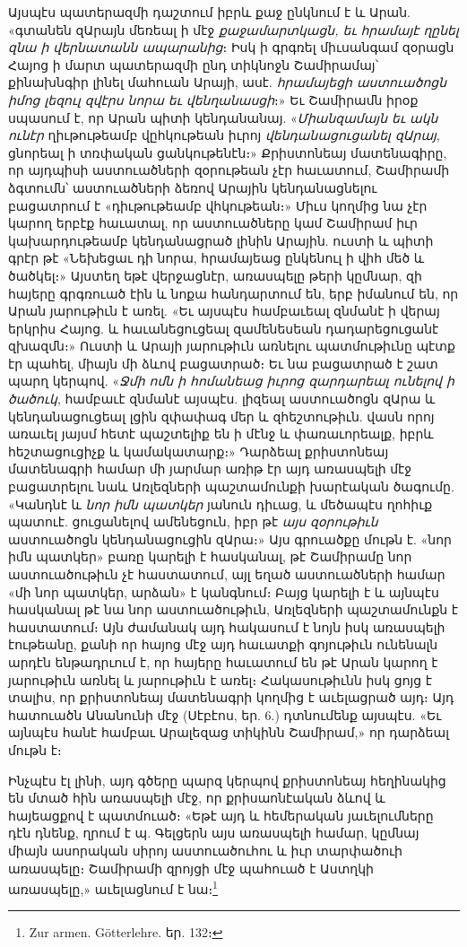 \documentclass{article}
\begin{document}
{Այսպէս պատերազմի դաշտում իբրև քաջ ընկնում է և Արան. «գտանեն զԱրայն մեռեալ ի մէջ \emph{քաջամարտկացն, եւ հրամայէ ղընել զնա ի վերնատանն ապարանից}։ Իսկ ի գրգռել միւսանգամ զօրացն Հայոց ի մարտ պատերազմի ընդ տիկնոջն Շամիրամայ՝ քինախնգիր լինել մահուան Արայի, ասէ. \emph{հրամայեցի աստուածոցն իմոց լեզուլ զվէրս նորա եւ վենղանասցի}։» Եւ Շամիրամն իրօք սպասում է, որ Արան պիտի կենդանանայ. «\emph{Միանզամայն եւ ակն ունէր} ղիւթութեամբ վըհկութեան իւրոյ \emph{վենդանացուցանել զԱրայ}, ցնորեալ ի տռփական ցանկութենէն։» Քրիստոնեայ մատենագիրը, որ այդպիսի աստուածների զօրութեան չէր հաւատում, Շամիրամի ձգտումն՝ աստուածների ձեռով Արային կենդանացնելու բացատրում է «դիւթութեամբ վհկութեան։» Միւս կողմից նա չէր կարող երբէք հաւատալ, որ աստուածները կամ Շամիրամ իւր կախարդութեամբ կենդանացրած լինին Արային. ուստի և պիտի գրէր թէ «Նեխեցաւ դի նորա, հրամայեաց ընկենուլ ի վիհ մեծ և ծածկել։» Այստեղ եթէ վերջացնէր, առասպելը թերի կըմնար, զի հայերը գրգռուած էին և նոքա հանդարտում են, երբ իմանում են, որ Արան յարութիւն է առել. «Եւ այսպէս համբաւեալ զնմանէ ի վերայ երկրիս Հայոց. և հաւանեցուցեալ զամենեսեան դադարեցուցանէ զխազմն։» Ուստի և Արայի յարութիւն առնելու պատմութիւնը պէտք էր պահել, միայն մի ձևով բացատրած։ Եւ նա բացատրած է շատ պարղ կերպով. «\emph{Ջմի ոմն ի հոմանեաց իւրոց զարդարեալ ունելով ի ծածուկ}, համբաւէ զնմանէ այսպէս. լիզեալ աստուածոցն զԱրա և կենդանացուցեալ լցին զփափագ մեր և զհեշտութիւն. վասն որոյ առաւել յայսմ հետէ պաշտելիք են ի մէնջ և փառաւորեալք, իբրև հեշտացուցիչք և կամակատարք։» Դարձեալ քրիստոնեայ մատենագրի համար մի յարմար առիթ էր այդ առասպելի մէջ բացատրելու նաև Առլեզների պաշտամունքի խարէական ծագումը. «Կանդնէ և \emph{նոր իմն պատկեր} յանուն դիւաց, և մեծապէս ղոհիւք պատուէ. ցուցանելով ամենեցուն, իբր թէ \emph{այս զօրութիւն} աստուածոցն կենդանացուցին զԱրա։» Այս գրուածքը մութն է. «նոր իմն պատկեր» բառը կարելի է հասկանալ, թէ Շամիրամը նոր աստուածութիւն չէ հաստատում, այլ եղած աստուածների համար «մի նոր պատկեր, արձան» է կանգնում։ Բայց կարելի է և այնպէս հասկանալ թէ նա նոր աստուածութիւն, Առլեզների պաշտամունքն է հաստատում։ Այն ժամանակ այդ հակասում է նոյն իսկ առասպելի էութեանը, քանի որ հայոց մէջ այդ հաւատքի գոյութիւն ունենալն արդէն ենթադրւում է, որ հայերը հաւատում են թէ Արան կարող է յարութիւն առնել և յարութիւն է առել։ Հակասութիւնն իսկ ցոյց է տալիս, որ քրիստոնեայ մատենագրի կողմից է աւելացրած այդ։ Այդ հատուածն Անանունի մէջ (Սէբէոս, եր. 6.) դտնումենք այսպէս. «Եւ այնպէս հանէ համբաւ Արալեզաց տիկինն Շամիրամ,» որ դարձեալ մութն է։

Ինչպէս էլ լինի, այդ գծերը պարզ կերպով քրիստոնեայ հեղինակից են մտած հին առասպելի մէջ, որ քրիսաոնէական ձևով և հայեացքով է պատմուած։ «Եթէ այդ և հեմերական յաւելումները դէն դնենք, ղրում է պ. Գելցերն այս առասպելի համար, կըմնայ միայն ասորական սիրոյ աստուածուհու և իւր տարփածուի առասպելը։ Շամիրամի զրոյցի մէջ պահուած է Աստղկի առասպելը,» աւելացնում է նա։\footnote{Zur armen. Götterlehre. եր. 132։}

}
\end{document}
